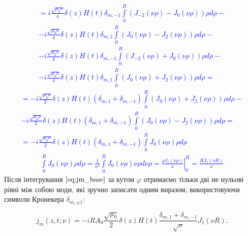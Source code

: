 %
\textcolor{blue} { \begin{equation*} \begin{aligned}
= i \frac{\sqrt{\mu_0 \nu}}{4} \delta(z) H(t)
\delta_{m,-1} \int \limits_{0}^{R} \left( J_{-2} (\nu \rho) - 
J_0 (\nu \rho) \right) \rho d \rho - \\
- i \frac{\sqrt{\mu_0 \nu}}{4} \delta(z) H(t)
\delta_{m,1} \int \limits_{0}^{R} \left( J_{0} (\nu \rho) - 
J_2 (\nu \rho) \right) \rho d \rho - \\
- i \frac{\sqrt{\mu_0 \nu}}{4} \delta(z) H(t)
\delta_{m,-1} \int \limits_{0}^{R} \left( J_{-2} (\nu \rho) +  
J_0 (\nu \rho) \right) \rho d \rho - \\
- i \frac{\sqrt{\mu_0 \nu}}{4} \delta(z) H(t)
\delta_{m,1} \int \limits_{0}^{R} \left( J_{0} (\nu \rho) +
J_2 (\nu \rho) \right) \rho d \rho =
\end{aligned} \end{equation*} }
%
\textcolor{blue} { \begin{equation*} \begin{aligned}
= - i \frac{\sqrt{\mu_0 \nu}}{2} \delta(z) H(t) 
(\delta_{m,1} + \delta_{m,-1}) 
\int \limits_{0}^{R} \left( J_{0} (\nu \rho) + 
J_2 (\nu \rho) \right) \rho d \rho - \\
- i \frac{\sqrt{\mu_0 \nu}}{2} \delta(z) H(t) 
(\delta_{m,1} + \delta_{m,-1}) 
\int \limits_{0}^{R} \left( J_{0} (\nu \rho) -
J_2 (\nu \rho) \right) \rho d \rho = \\
= - i \frac{\sqrt{\mu_0 \nu}}{2} \delta(z) H(t) 
(\delta_{m,1} + \delta_{m,-1}) 
\int \limits_{0}^{R} J_{0} (\nu \rho) \rho d \rho
\end{aligned} \end{equation*} }
%
\textcolor{blue} { \begin{equation*} \begin{aligned}
\int \limits_{0}^{R} J_{0} (\nu \rho) \rho d \rho = 
\frac{1}{\nu^2} \int \limits_{0}^{R} J_{0} (\nu \rho) \nu \rho d \nu \rho =
\left. \frac{\rho J_1 (\nu \rho) }{\nu} \right|_{0}^{R} = 
\frac{R J_1 (\nu R)}{\nu}
\end{aligned} \end{equation*} }
%
Після інтегрування $ \eqref{eq:jm_base} $ за кутом $ \varphi $ отримаємо 
тільки дві не нульові рівні між собою моди, які зручно записати одним 
виразом, використовуючи символи Кронекера $ \delta_{m,\pm1} $:

\begin{equation} 
j_m (z, t; \nu) = - i R A_0 \frac{\sqrt{\mu_0}}{2} \delta(z) H(t) 
\frac{\delta_{m,1} + \delta_{m,-1}}{\sqrt{\nu}} J_1 (\nu R).
\end{equation}

